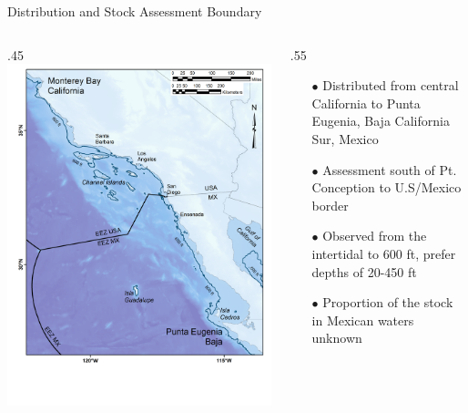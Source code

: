 \documentclass[ignorenonframetext,]{beamer}
\def\begincols{\begin{columns}}
\def\begincol{\begin{column}}
\def\endcol{\end{column}}
\def\endcols{\end{columns}}
\begin{document}
\begin{frame}{Distribution and Stock Assessment Boundary}

\begincols
 \begincol{.45\textwidth}
\includegraphics{Figures/assess_region_map.png}

\endcol
 \begincol{.55\textwidth}

\begin{itemize} 
 \item[$\bullet$] Distributed from central California to Punta Eugenia, Baja California Sur, Mexico 
 \item[$\bullet$] Assessment south of Pt. Conception to U.S/Mexico border 
 \item[$\bullet$] Observed from the intertidal to 600 ft,  prefer depths of 20-450 ft  
 \item[$\bullet$] Proportion of the stock in Mexican waters unknown
\end{itemize}

\endcol
\endcols

\end{frame}
\end{document}
